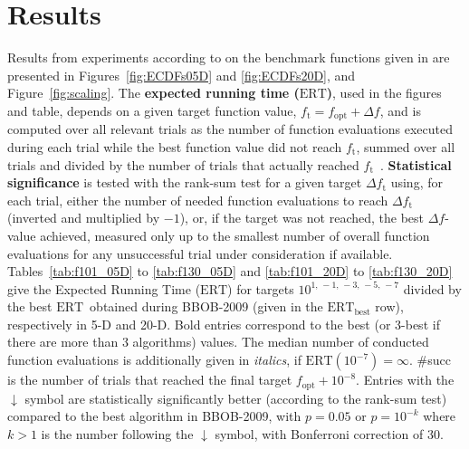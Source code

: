 \documentclass{article}
\newcommand{\ERT}{\ensuremath{\mathrm{ERT}}}
\newcommand{\Df}{\ensuremath{\Delta f}}
\newcommand{\fopt}{\ensuremath{f_\mathrm{opt}}}
\newcommand{\ftarget}{\ensuremath{f_\mathrm{t}}}
\begin{document}
\section{Results}
Results from experiments according to \cite{hansen2010exp} on the benchmark
functions given in \cite{wp200902_2010,hansen2010noi} are presented in 
Figures~\ref{fig:ECDFs05D} and \ref{fig:ECDFs20D}, and Figure~\ref{fig:scaling}.
The \textbf{expected running time (\ERT)}, used in the figures and table,
depends on a given target function value, $\ftarget=\fopt+\Df$, and is computed
over all relevant trials as the number of function evaluations executed during
each trial while the best function value did not reach \ftarget, summed over
all trials and divided by the number of trials that actually reached \ftarget\
\cite{hansen2010exp,price1997dev}.
\textbf{Statistical significance} is tested with the rank-sum test for a given
target $\Delta\ftarget$ using, for each trial, either the number of needed
function evaluations to reach $\Delta\ftarget$ (inverted and multiplied by
$-1$), or, if the target was not reached, the best $\Df$-value achieved,
measured only up to the smallest number of overall function evaluations for any
unsuccessful trial under consideration if available.
Tables~\ref{tab:f101_05D} to \ref{tab:f130_05D} and \ref{tab:f101_20D} to
\ref{tab:f130_20D} give the Expected Running Time (\ERT) for targets
$10^{1,\,-1,\,-3,\,-5,\,-7}$ divided by the best \ERT\ obtained during
BBOB-2009 (given in the \ERT$_{\text{best}}$ row), respectively in 5-D
and 20-D.
Bold entries correspond to the best (or 3-best if there are more than 3
algorithms) values.
The median number of conducted function evaluations is additionally given in
\textit{italics}, if $\ERT(10^{-7}) =\infty$.
\#succ is the number of trials that reached the final target $\fopt + 10^{-8}$.
Entries with the $\downarrow$ symbol are statistically significantly better 
(according to the rank-sum test) compared to the best algorithm in BBOB-2009,
with $p=0.05$ or $p=10^{-k}$ where $k>1$ is the number
following the $\downarrow$ symbol, with Bonferroni correction of 30.
\end{document}
